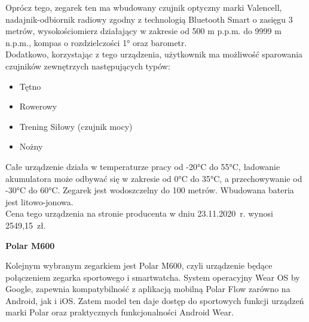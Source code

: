 \documentclass[a4paper,12pt,reqno]{article}
\begin{document}
Oprócz tego, zegarek ten ma wbudowany czujnik optyczny marki Valencell, nadajnik-odbiornik radiowy zgodny z technologią Bluetooth Smart o zasięgu 3 metrów, wysokościomierz działający w zakresie od 500 m p.p.m. do 9999 m n.p.m., kompas o rozdzielczości 1° oraz barometr.\\

Dodatkowo, korzystając z tego urządzenia, użytkownik ma możliwość sparowania czujników zewnętrzych następujących typów:
\begin{itemize}
	\item Tętno
	\item Rowerowy
	\item Trening Siłowy (czujnik mocy)
	\item Nożny
\end{itemize}

Całe urządzenie działa w temperaturze pracy od -20°C do 55°C, ładowanie akumulatora może odbywać się w zakresie od 0°C do 35°C, a przechowywanie od -30°C do 60°C. Zegarek jest wodoszczelny do 100 metrów. Wbudowana bateria jest litowo-jonowa.\\

Cena tego urządzenia na stronie producenta w dniu 23.11.2020~r. wynosi 2549,15~zł.
\vspace{1cm}
\begin{flushleft}
	\textbf{Polar M600}
\end{flushleft}

Kolejnym wybranym zegarkiem jest Polar M600, czyli urządzenie będące połączeniem zegarka sportowego i smartwatcha.
System operacyjny Wear OS by Google, zapewnia kompatybilność z aplikacją mobilną Polar Flow zarówno na Android, jak i iOS. Zatem model ten daje dostęp do sportowych funkcji urządzeń marki Polar oraz praktycznych funkcjonalności Android Wear.\\
\end{document}
